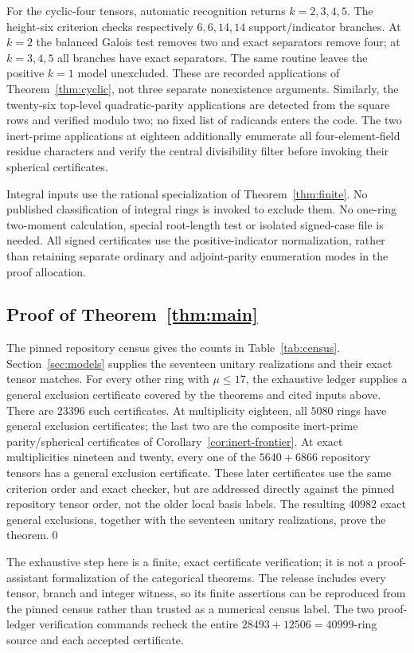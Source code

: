 For the cyclic-four tensors, automatic recognition returns $k=2,3,4,5$.
The height-six criterion checks respectively $6,6,14,14$ support/indicator
branches. At $k=2$ the balanced Galois test removes two and exact
separators remove four; at $k=3,4,5$ all branches have exact separators.
The same routine leaves the positive $k=1$ model unexcluded.
These are recorded applications of Theorem~\ref{thm:cyclic}, not three
separate nonexistence arguments. Similarly, the twenty-six top-level
quadratic-parity applications are detected from the square rows and
verified modulo two; no fixed list of radicands enters the code. The
two inert-prime applications at eighteen additionally enumerate all
four-element-field residue characters and verify the central divisibility
filter before invoking their spherical certificates.

Integral inputs use the rational specialization of
Theorem~\ref{thm:finite}. No published classification of integral rings
is invoked to exclude them. No one-ring two-moment calculation, special
root-length test or isolated signed-case file is needed. All signed
certificates use the positive-indicator normalization, rather than
retaining separate ordinary and adjoint-parity enumeration modes in the
proof allocation.

\subsection{Proof of Theorem~\ref{thm:main}}
The pinned repository census \cite{Census} gives the counts in
Table~\ref{tab:census}. Section~\ref{sec:models} supplies the
seventeen unitary realizations and their exact tensor matches.
For every other ring with $\mu\le17$, the exhaustive ledger supplies a
general exclusion certificate covered by the theorems and cited inputs
above. There are $23396$ such certificates. At multiplicity eighteen,
all $5080$ rings have general exclusion certificates; the last two are
the composite inert-prime parity/spherical certificates of
Corollary~\ref{cor:inert-frontier}. At exact
multiplicities nineteen and twenty, every one of the $5640+6866$
repository tensors has a general exclusion certificate. These later
certificates use the same criterion order and exact checker, but are
addressed directly against the pinned repository tensor order, not the
older local basis labels. The resulting $40982$ exact general exclusions,
together with the seventeen unitary realizations, prove the theorem.\qed

The exhaustive step here is a finite, exact certificate verification;
it is not a proof-assistant formalization of the categorical theorems.
The release includes every tensor, branch and integer witness, so its
finite assertions can be reproduced from the pinned census rather than
trusted as a numerical census label. The two proof-ledger verification
commands recheck the entire $28493+12506=40999$-ring source and each
accepted certificate.

